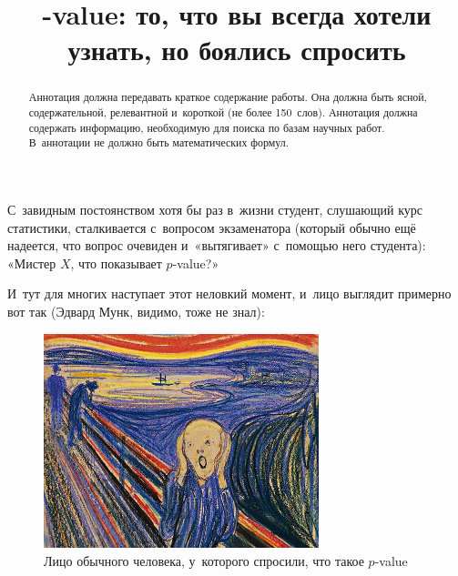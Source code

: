 \documentclass[final,pdftex]{epsilonj}
\begin{document}
	
	\begin{frontmatter}
		\title{-value: то, что вы всегда хотели узнать, но боялись спросить}
		
		\begin{aug}
			\author{ }
			\address{НИУ ВШЭ, Москва.}
		\end{aug}
		
		\begin{abstract}
			Аннотация должна передавать краткое содержание работы.
			Она должна быть ясной, содержательной, релевантной и~короткой
			(не более 150~слов). Аннотация должна содержать информацию,
			необходимую для поиска по базам научных работ.
			В~аннотации не должно быть математических формул.
		\end{abstract}
		
		\begin{keyword}
		\end{keyword}
		
	\end{frontmatter}
	


С~завидным постоянством хотя бы раз в~жизни студент, слушающий курс статистики, сталкивается с~вопросом экзаменатора (который обычно ещё надеется, что вопрос очевиден и~«вытягивает» с~помощью него студента): «Мистер $X$, что показывает $p$-value?»

И~тут для многих наступает этот неловкий момент, и~лицо выглядит примерно вот так (Эдвард Мунк, видимо, тоже не знал):

\begin{figure}[htbp]
	\centering
	\includegraphics[width=8cm]{munk-small.jpg}
	\caption{Лицо обычного человека, у~которого спросили, что такое $p$-value}
\end{figure}
\end{document}
